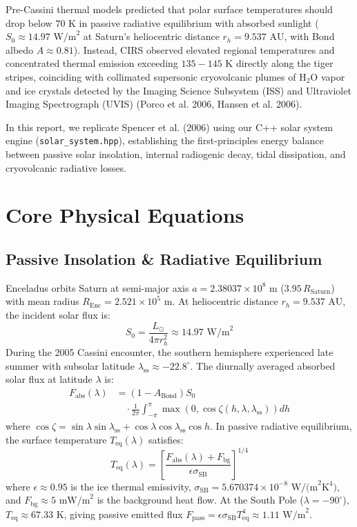 \documentclass[10pt,twocolumn,a4paper]{article}
\begin{document}
Pre-Cassini thermal models predicted that polar surface temperatures should drop below $70\text{ K}$ in passive radiative equilibrium with absorbed sunlight ($S_0 \approx 14.97\text{ W/m}^2$ at Saturn's heliocentric distance $r_h = 9.537\text{ AU}$, with Bond albedo $A \approx 0.81$). Instead, CIRS observed elevated regional temperatures and concentrated thermal emission exceeding $135-145\text{ K}$ directly along the tiger stripes, coinciding with collimated supersonic cryovolcanic plumes of $\text{H}_2\text{O}$ vapor and ice crystals detected by the Imaging Science Subsystem (ISS) and Ultraviolet Imaging Spectrograph (UVIS) (Porco et al. 2006, Hansen et al. 2006).

In this report, we replicate Spencer et al. (2006) using our C++ solar system engine (\texttt{solar\_system.hpp}), establishing the first-principles energy balance between passive solar insolation, internal radiogenic decay, tidal dissipation, and cryovolcanic radiative losses.

\section{Core Physical Equations}

\subsection{Passive Insolation \& Radiative Equilibrium}
Enceladus orbits Saturn at semi-major axis $a = 2.38037 \times 10^8\text{ m}$ ($3.95\,R_{\text{Saturn}}$) with mean radius $R_{\text{Enc}} = 2.521 \times 10^5\text{ m}$. At heliocentric distance $r_h = 9.537\text{ AU}$, the incident solar flux is:
\begin{equation}
S_0 = \frac{L_\odot}{4\pi r_h^2} \approx 14.97\text{ W/m}^2
\end{equation}
During the 2005 Cassini encounter, the southern hemisphere experienced late summer with subsolar latitude $\lambda_{\text{ss}} \approx -22.8^{\circ}$. The diurnally averaged absorbed solar flux at latitude $\lambda$ is:
\begin{align}
F_{\text{abs}}(\lambda) &= (1 - A_{\text{Bond}}) S_0 \nonumber \\
&\quad \cdot \frac{1}{2\pi} \int_{-\pi}^{\pi} \max\left(0, \cos\zeta(h, \lambda, \lambda_{\text{ss}})\right) dh
\end{align}
where $\cos\zeta = \sin\lambda \sin\lambda_{\text{ss}} + \cos\lambda \cos\lambda_{\text{ss}} \cos h$. In passive radiative equilibrium, the surface temperature $T_{\text{eq}}(\lambda)$ satisfies:
\begin{equation}
T_{\text{eq}}(\lambda) = \left[ \frac{F_{\text{abs}}(\lambda) + F_{\text{bg}}}{\epsilon \sigma_{\text{SB}}} \right]^{1/4}
\end{equation}
where $\epsilon \approx 0.95$ is the ice thermal emissivity, $\sigma_{\text{SB}} = 5.670374 \times 10^{-8}\text{ W/(m}^2\text{K}^4)$, and $F_{\text{bg}} \approx 5\text{ mW/m}^2$ is the background heat flow. At the South Pole ($\lambda = -90^{\circ}$), $T_{\text{eq}} \approx 67.33\text{ K}$, giving passive emitted flux $F_{\text{pass}} = \epsilon \sigma_{\text{SB}} T_{\text{eq}}^4 \approx 1.11\text{ W/m}^2$.
\end{document}
